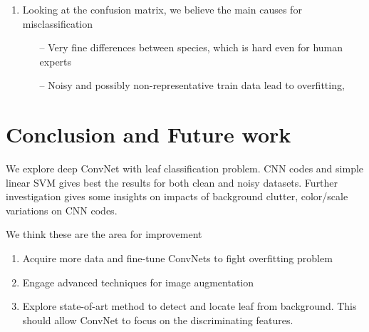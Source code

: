 \documentclass[journal, 10pt]{IEEEtran}
\begin{document}
\begin{enumerate}
\item Looking at the confusion matrix, we believe the main causes for misclassification
      \begin{itemize}
        \item [--] Very fine differences between species, which is hard even for human experts
        \item [--] Noisy and possibly non-representative train data lead to overfitting,
      \end{itemize}
\end{enumerate}

\section{Conclusion and Future work}
We explore deep ConvNet with leaf classification problem. CNN codes and simple linear SVM gives best the results for both clean and noisy datasets. Further investigation gives some insights on impacts of background clutter, color/scale variations on CNN codes.

We think these are the area for improvement
  \begin{enumerate}
    \item Acquire more data and fine-tune ConvNets to fight overfitting problem
    \item Engage advanced techniques for image augmentation
    \item Explore state-of-art method to detect and locate leaf from background. This should allow ConvNet to focus on the discriminating features.
  \end{enumerate}



%
\end{document}
